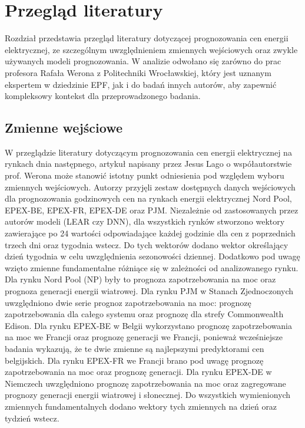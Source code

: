 \chapter{Przegląd literatury}
\label{ch:literatura}
Rozdział przedstawia przegląd literatury dotyczącej prognozowania cen energii elektrycznej, ze szczególnym uwzględnieniem zmiennych wejściowych oraz zwykle używanych modeli prognozowania. W analizie odwołano się zarówno do prac profesora Rafała Werona z Politechniki Wrocławskiej, który jest uznanym ekspertem w dziedzinie EPF, jak i do badań innych autorów, aby zapewnić kompleksowy kontekst dla przeprowadzonego badania.

\section{Zmienne wejściowe}
\label{sec:zmienne_wejsciowe_literatura}

W przeglądzie literatury dotyczącym prognozowania cen energii elektrycznej na rynkach dnia następnego, artykuł napisany przez Jesus Lago o współautorstwie prof. Werona \cite{LAGO2021116983} może stanowić istotny punkt odniesienia pod względem wyboru zmiennych wejściowych. Autorzy przyjęli zestaw dostępnych danych wejściowych dla prognozowania godzinowych cen na rynkach energii elektrycznej Nord Pool, EPEX-BE, EPEX-FR, EPEX-DE oraz PJM.
Niezależnie od zastosowanych przez autorów modeli (LEAR czy DNN), dla wszystkich rynków stworzono wektory zawierające po 24 wartości odpowiadające każdej godzinie dla cen z poprzednich trzech dni oraz tygodnia wstecz. Do tych wektorów dodano wektor określający dzień tygodnia w celu uwzględnienia sezonowości dziennej. Dodatkowo pod uwagę wzięto zmienne fundamentalne różniące się w zależności od analizowanego rynku. \newline
Dla rynku Nord Pool (NP) były to prognoza zapotrzebowania na moc oraz prognoza generacji energii wiatrowej.\newline
Dla rynku PJM w Stanach Zjednoczonych uwzględniono dwie serie prognoz zapotrzebowania na moc: prognozę zapotrzebowania dla całego systemu oraz prognozę dla strefy Commonwealth Edison.\newline
Dla rynku EPEX-BE w Belgii wykorzystano prognozę zapotrzebowania na moc we Francji oraz prognozę generacji we Francji, ponieważ wcześniejsze badania wykazują, że te dwie zmienne są najlepszymi predyktorami cen belgijskich. \newline
Dla rynku EPEX-FR we Francji brano pod uwagę prognozę zapotrzebowania na moc oraz prognozę generacji.\newline
Dla rynku EPEX-DE w Niemczech uwzględniono prognozę zapotrzebowania na moc oraz zagregowane prognozy generacji energii wiatrowej i słonecznej.\newline
Do wszystkich wymienionych zmiennych fundamentalnych dodano wektory tych zmiennych na dzień oraz tydzień wstecz.

